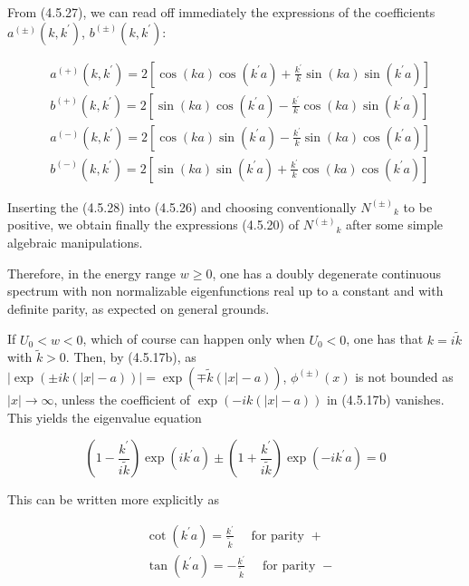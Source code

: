 \documentclass{article}
\begin{document}
From (4.5.27), we can read off immediately the expressions of the coefficients $a^{( \pm)}\left(k, k^{\prime}\right)$, $b^{( \pm)}\left(k, k^{\prime}\right):$
 
\begin{align*}
& a^{(+)}\left(k, k^{\prime}\right)=2\left[\cos (k a) \cos \left(k^{\prime} a\right)+\frac{k^{\prime}}{k} \sin (k a) \sin \left(k^{\prime} a\right)\right]  \tag{4.5.28a}\\
& b^{(+)}\left(k, k^{\prime}\right)=2\left[\sin (k a) \cos \left(k^{\prime} a\right)-\frac{k^{\prime}}{k} \cos (k a) \sin \left(k^{\prime} a\right)\right]  \tag{4.5.28b}\\
& a^{(-)}\left(k, k^{\prime}\right)=2\left[\cos (k a) \sin \left(k^{\prime} a\right)-\frac{k^{\prime}}{k} \sin (k a) \cos \left(k^{\prime} a\right)\right]  \tag{4.5.28c}\\
& b^{(-)}\left(k, k^{\prime}\right)=2\left[\sin (k a) \sin \left(k^{\prime} a\right)+\frac{k^{\prime}}{k} \cos (k a) \cos \left(k^{\prime} a\right)\right] \tag{4.5.28d}
\end{align*}
 

Inserting the (4.5.28) into (4.5.26) and choosing conventionally $N^{( \pm)}{ }_{k}$ to be positive, we obtain finally the expressions (4.5.20) of $N^{( \pm)}{ }_{k}$ after some simple algebraic manipulations.

Therefore, in the energy range $w \geq 0$, one has a doubly degenerate continuous spectrum with non normalizable eigenfunctions real up to a constant and with definite parity, as expected on general grounds.

If $U_{0}<w<0$, which of course can happen only when $U_{0}<0$, one has that $k=i \tilde{k}$ with $\tilde{k}>0$. Then, by (4.5.17b), as $|\exp ( \pm i k(|x|-a))|=\exp (\mp \tilde{k}(|x|-a))$, $\phi^{( \pm)}(x)$ is not bounded as $|x| \rightarrow \infty$, unless the coefficient of $\exp (-i k(|x|-a))$ in (4.5.17b) vanishes. This yields the eigenvalue equation
 
\begin{equation*}
\left(1-\frac{k^{\prime}}{i \tilde{k}}\right) \exp \left(i k^{\prime} a\right) \pm\left(1+\frac{k^{\prime}}{i \tilde{k}}\right) \exp \left(-i k^{\prime} a\right)=0 \tag{4.5.29}
\end{equation*}
 

This can be written more explicitly as
 
\begin{align*}
& \cot \left(k^{\prime} a\right)=\frac{k^{\prime}}{\tilde{k}} \quad \text { for parity }+  \tag{4.5.30a}\\
& \tan \left(k^{\prime} a\right)=-\frac{k^{\prime}}{\tilde{k}} \quad \text { for parity }- \tag{4.5.30b}
\end{align*}
 
\end{document}
